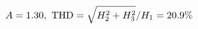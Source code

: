 \documentclass[preview]{standalone}
\begin{document}
\begin{align*}
\special{dvisvgm:raw <g id='unique000'>}A=1.30,\ \text{THD}=\sqrt{H_2^2+H_3^2}/H_1=20.9\%\special{dvisvgm:raw </g>}
\end{align*}
\end{document}
